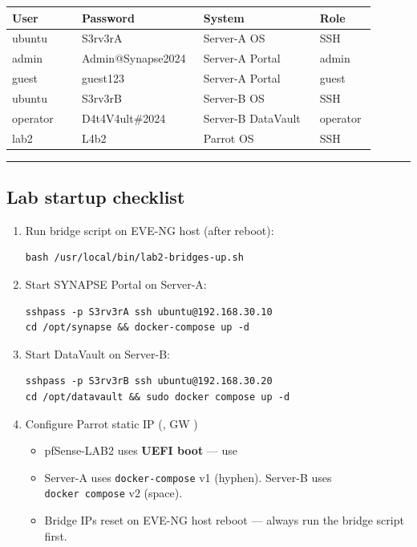 {\footnotesize\begin{longtable}[]{@{}
  >{\raggedright\arraybackslash}p{0.18\linewidth}
  >{\raggedright\arraybackslash}p{0.28\linewidth}
  >{\raggedright\arraybackslash}p{0.30\linewidth}
  >{\raggedright\arraybackslash}p{0.14\linewidth}@{}}

\toprule\noalign{}
User & Password & System & Role \\
\midrule\noalign{}
\endhead
\bottomrule\noalign{}
\endlastfoot
ubuntu & S3rv3rA & Server-A OS & SSH \\
admin & Admin@Synapse2024 & Server-A Portal & admin \\
guest & guest123 & Server-A Portal & guest \\
ubuntu & S3rv3rB & Server-B OS & SSH \\
operator & D4t4V4ult\#2024 & Server-B DataVault & operator \\
lab2 & L4b2 & Parrot OS & SSH \\
\end{longtable}}

\begin{center}\rule{0.5\linewidth}{0.5pt}\end{center}

\subsection{Lab startup checklist}

\begin{enumerate}
\def\labelenumi{\arabic{enumi}.}
\item
  Run bridge script on EVE-NG host (after reboot):

\begin{lstlisting}
bash /usr/local/bin/lab2-bridges-up.sh
\end{lstlisting}
\item
  Start SYNAPSE Portal on Server-A:

\begin{lstlisting}
sshpass -p S3rv3rA ssh ubuntu@192.168.30.10
cd /opt/synapse && docker-compose up -d
\end{lstlisting}
\item
  Start DataVault on Server-B:

\begin{lstlisting}
sshpass -p S3rv3rB ssh ubuntu@192.168.30.20
cd /opt/datavault && sudo docker compose up -d
\end{lstlisting}
\item
  Configure Parrot static IP (, GW )

  \begin{itemize}
  \tightlist
  \item
    pfSense-LAB2 uses \textbf{UEFI boot} --- use 
  \item
    Server-A uses \texttt{docker-compose} v1 (hyphen). Server-B uses \texttt{docker\ compose} v2 (space).
  \item
    Bridge IPs reset on EVE-NG host reboot --- always run the bridge script first.
  \end{itemize}
\end{enumerate}

